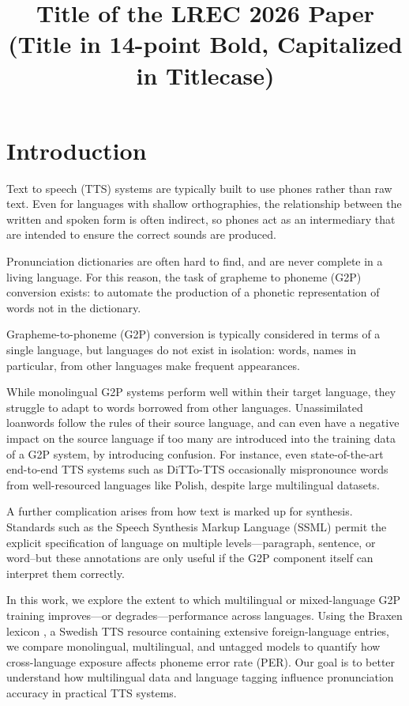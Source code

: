 \documentclass[10pt, a4paper]{article}
\title{Title of the LREC 2026 Paper (Title in 14-point Bold, Capitalized in Titlecase)}
\begin{document}
\maketitleabstract

\section{Introduction}

Text to speech (TTS) systems are typically built to use phones rather than raw text. Even for languages with shallow orthographies, the relationship between the written and spoken form is often indirect, so phones act as an intermediary that are intended to ensure the correct sounds are produced.

Pronunciation dictionaries are often hard to find, and are never complete in a living language. For this reason, the task of grapheme to phoneme (G2P) conversion exists: to automate the production of a phonetic representation of words not in the dictionary.

Grapheme-to-phoneme (G2P) conversion is typically considered in terms of a single language, but languages do not exist in isolation: words, names in particular, from other languages make frequent appearances.

While monolingual G2P systems perform well within their target language, they struggle to adapt to words borrowed from other languages. Unassimilated loanwords follow the rules of their source language, and can even have a negative impact on the source language if too many are introduced into the training data of a G2P system, by introducing confusion. For instance, even state-of-the-art end-to-end TTS systems such as DiTTo-TTS \cite{lee2025dittotts} occasionally mispronounce words from well-resourced languages like Polish, despite large multilingual datasets.

A further complication arises from how text is marked up for synthesis. Standards such as the Speech Synthesis Markup Language (SSML) \cite{w3c:ssml11} permit the explicit specification of language on multiple levels—paragraph, sentence, or word--but these annotations are only useful if the G2P component itself can interpret them correctly.

In this work, we explore the extent to which multilingual or mixed-language G2P training improves—or degrades—performance across languages. Using the Braxen lexicon \cite{tannander-edlund-2025-braxen}, a Swedish TTS resource containing extensive foreign-language entries, we compare monolingual, multilingual, and untagged models to quantify how cross-language exposure affects phoneme error rate (PER). Our goal is to better understand how multilingual data and language tagging influence pronunciation accuracy in practical TTS systems.
\end{document}

